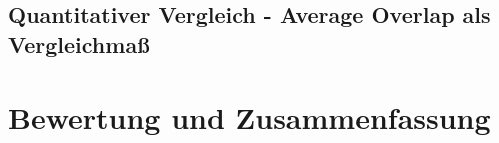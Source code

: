 \section{Quantitativer Vergleich - Average Overlap als Vergleichma\ss}




\chapter{Bewertung und Zusammenfassung}



\nocite{*}%
 

